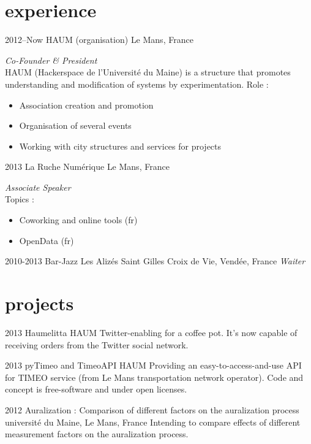 \documentclass[]{friggeri-cv} %
\begin{document}

\section{experience}

\begin{entrylist}
\entry
{2012--Now}
{HAUM (organisation)}
{Le Mans, France}
{\emph{Co-Founder \& President} \\
HAUM (Hackerspace de l'Université du Maine) is a structure that promotes
understanding and modification of systems by experimentation.
Role :
\begin{itemize}
    \item Association creation and promotion
    \item Organisation of several events
    \item Working with city structures and services for projects
\end{itemize}
}
\entry
{2013}
{La Ruche Numérique}
{Le Mans, France}
{\emph{Associate Speaker}\\
Topics :
\begin{itemize}
    \item Coworking and online tools (fr)
    \item OpenData (fr)
\end{itemize}}
\entry
{2010-2013}
{Bar-Jazz Les Alizés}
{Saint Gilles Croix de Vie, Vendée, France}
{\emph{Waiter}}
\end{entrylist}


\section{projects}

\begin{entrylist}
\entry
{2013}
{Haumelitta}
{HAUM}
{Twitter-enabling for a coffee pot. It's now capable of receiving orders from the Twitter social network.}

\entry
{2013}
{pyTimeo and TimeoAPI}
{HAUM}
{Providing an easy-to-access-and-use API for TIMEO service (from Le Mans transportation network operator).
Code and concept is free-software and under open licenses.}

\entry
{2012}
{Auralization : Comparison of different factors on the auralization process}
{université du Maine, Le Mans, France}
{Intending to compare effects of different measurement factors on the auralization process.}
\end{entrylist}
\end{document}
